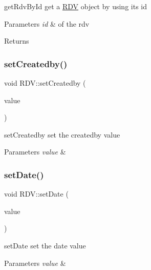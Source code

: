 get\+Rdv\+By\+Id get a \mbox{\hyperlink{class_r_d_v}{R\+DV}} object by using its id 


\begin{DoxyParams}{Parameters}
{\em id} & of the rdv \\
\hline
\end{DoxyParams}
\begin{DoxyReturn}{Returns}

\end{DoxyReturn}
\mbox{\label{class_r_d_v_a7899f8ed714f31e6d8ffa8c998d21f4b}} 
\subsubsection{\texorpdfstring{setCreatedby()}{setCreatedby()}}
{\footnotesize\ttfamily void R\+D\+V\+::set\+Createdby (\begin{DoxyParamCaption}\item[{const \mbox{\hyperlink{class_utilisateur}{Utilisateur}} \&}]{value }\end{DoxyParamCaption})}



set\+Createdby set the createdby value 


\begin{DoxyParams}{Parameters}
{\em value} & \\
\hline
\end{DoxyParams}
\mbox{\label{class_r_d_v_a33de832512fc2d6542ea961efadf3be4}} 
\subsubsection{\texorpdfstring{setDate()}{setDate()}}
{\footnotesize\ttfamily void R\+D\+V\+::set\+Date (\begin{DoxyParamCaption}\item[{const Q\+String \&}]{value }\end{DoxyParamCaption})}



set\+Date set the date value 


\begin{DoxyParams}{Parameters}
{\em value} & \\
\hline
\end{DoxyParams}
\mbox{\label{class_r_d_v_a2fb6c269a4395db5525cf31199b301d9}} 
